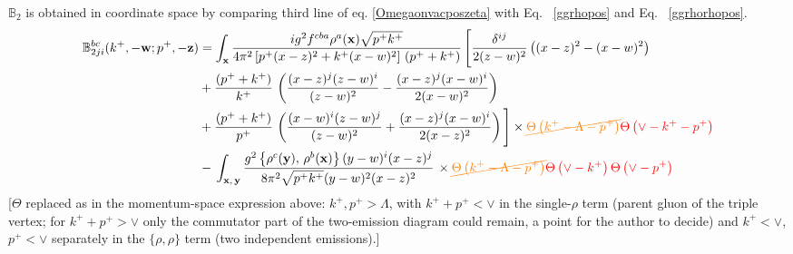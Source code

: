 \documentclass[aps,prd,amsmath,amssymb,nofootinbib]{revtex4-2}
\def\mf#1{\mathbb{#1}}
\def\v#1{\mathbf{#1}}
\numberwithin{equation}{section}
\begin{document}
$\mf{B}_{2}$ is obtained in coordinate space by comparing third line of eq. \eqref{Omegaonvacposzeta} with Eq.~ \eqref{ggrhopos} and Eq.~ \eqref{ggrhorhopos}.
\begin{align}
     \mf{B}^{bc}_{2ji}(k^{+}, -\v{w}; p^{+}, -\v{z}) & =    \int_{\mathbf{x}}\frac{ig^{2}f^{cba}\rho^{a}(\mathbf{x})\sqrt{p^{+}k^{+}}}{4\pi^{2}\left[p^{+}(x-z)^{2}+k^{+} (x-w)^{2}\right]\,(p^{+}+k^{+})}\,\Bigg[\frac{\delta^{ij}}{2(z-w)^{2}}\left((x-z)^{2}-(x-w)^{2}\right)\notag \\ & +\frac{(p^{+}+k^{+})}{k^{+}}\,\left(\frac{(x-z)^{j}(z-w)^{i}}{(z-w)^{2}}-\frac{(x-z)^{j}(x-w)^{i}}{2(x-w)^{2}}\right)\notag \\ & +\frac{(p^{+}+k^{+})}{p^{+}}\,\left(\frac{(x-w)^{i}(z-w)^{j}}{(z-w)^{2}} +\frac{(x-z)^{j}(x-w)^{i}}{2(x-z)^{2}}\right)\Bigg]\times {\color{orange}\cancel{\Theta\left(k^{+}-\Lambda-p^{+}\right)}}{\color{red}\Theta\left(\vee-k^{+}-p^{+}\right)} \notag \\ & -\,\int_{\mathbf{x},\,\mathbf{y}}\frac{g^{2}\left\{ \rho^{c}(\mathbf{y}),\,\rho^{b}(\mathbf{x})\right\} (y-w)^{i}(x-z)^{j}}{8\pi^{2}\sqrt{p^{+}k^{+}}(y-w)^{2}(x-z)^{2}}\,\times {\color{orange}\cancel{\Theta\left(k^{+}-\Lambda-p^{+}\right)}}{\color{red}\Theta\left(\vee-k^{+}\right)\Theta\left(\vee-p^{+}\right)}
\end{align} {\color{red}[$\Theta$ replaced as in the momentum-space expression above: $k^+,p^+>\Lambda$, with $k^++p^+<\vee$ in the single-$\rho$ term (parent gluon of the triple vertex; for $k^++p^+>\vee$ only the commutator part of the two-emission diagram could remain, a point for the author to decide) and $k^+<\vee$, $p^+<\vee$ separately in the $\{\rho,\rho\}$ term (two independent emissions).]}\par\noindent 
\end{document}
